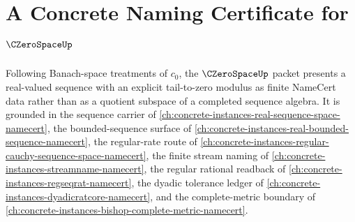 \chapter{A Concrete Naming Certificate for $\CZeroSpaceUp$}
\label{ch:concrete-instances-c-zero-space-namecert}

Following Banach-space treatments of $c_0$, the $\CZeroSpaceUp$ packet presents a real-valued sequence with an explicit tail-to-zero modulus as finite NameCert data rather than as a quotient subspace of a completed sequence algebra. It is grounded in the sequence carrier of \autoref{ch:concrete-instances-real-sequence-space-namecert}, the bounded-sequence surface of \autoref{ch:concrete-instances-real-bounded-sequence-namecert}, the regular-rate route of \autoref{ch:concrete-instances-regular-cauchy-sequence-space-namecert}, the finite stream naming of \autoref{ch:concrete-instances-streamname-namecert}, the regular rational readback of \autoref{ch:concrete-instances-regseqrat-namecert}, the dyadic tolerance ledger of \autoref{ch:concrete-instances-dyadicratcore-namecert}, and the complete-metric boundary of \autoref{ch:concrete-instances-bishop-complete-metric-namecert}.

